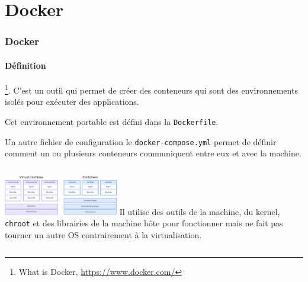 \documentclass{beamer}
\begin{document}
    \section{Docker}\label{sec:docker}

    \begin{frame}
        \transdissolve
        \frametitle{Docker}
        \framesubtitle{Définition}
        \footnote{What is Docker, \url{https://www.docker.com/}}.
        \bigbreak
        C'est un outil qui permet de créer des conteneurs qui sont des environnements isolés pour exécuter des applications.

        Cet environnement portable est défini dans la \lstinline{Dockerfile}.

        Un autre fichier de configuration le \lstinline{docker-compose.yml} permet de définir comment un ou plusieurs conteneurs communiquent entre eux et avec la machine.
        \bigbreak
        \begin{columns}
            \centering
            \includegraphics[width=5cm]{image/docker-vs-vm.png}\footnotemark
            Il utilise des outils de la machine, du kernel, \lstinline{chroot} et des librairies de la machine hôte pour fonctionner mais ne fait pas tourner un autre OS contrairement à la virtualisation.
        \end{columns}
    \end{frame}
\end{document}

